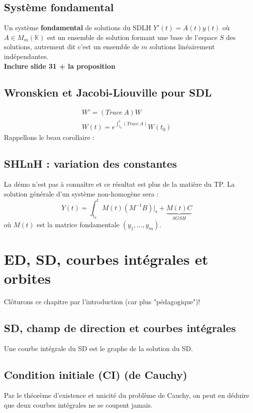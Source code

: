 \documentclass[11pt, a4paper, openany]{book}
\begin{document}
\subsection{Système fondamental}
Un système \textbf{fondamental} de solutions du SDLH $Y'(t) = A(t)y(t)$ où $A \in M_m(\mathbb{K})$ est un ensemble de solution formant une base de l'espace $S$ des solutions, autrement dit c'est un ensemble de $m$ solutions linéairement indépendantes.\\
\textbf{Inclure slide 31  + la proposition}
		
\subsection{Wronskien et Jacobi-Liouville pour SDL}
\begin{eqnarray}
	W' = (Trace\ A)W\\
	W(t) = e^{\int_{t_0}^t (Trace\ A)}W(t_0)
\end{eqnarray}
Rappellons le beau corollaire :\\
		
\subsection{SHLnH : variation des constantes}
La démo n'est pas à connaître et ce résultat est plus de la matière du TP. La solution générale d'un système non-homogène sera :
\begin{equation}
	Y(t) = \int_{t_0}^t M(t)(M^{-1}B)|_s + \underbrace{M(t)C}_{SGSH}
\end{equation}
où $M(t)$ est la matrice fondamentale $(y_1,\dots,y_m)$.
		
\setcounter{section}{0}
\section{ED, SD, courbes intégrales et orbites}
Clôturons ce chapitre par l'introduction (car plus "pédagogique")! 
\subsection{SD, champ de direction et courbes intégrales}
Une courbe intégrale du SD est le graphe de la solution du SD.
		
\subsection{Condition initiale (CI) (de Cauchy)}
Par le théorème d'existence et unicité du problème de Cauchy, on peut en déduire que deux courbes intégrales ne se coupent jamais.
		
\end{document}
